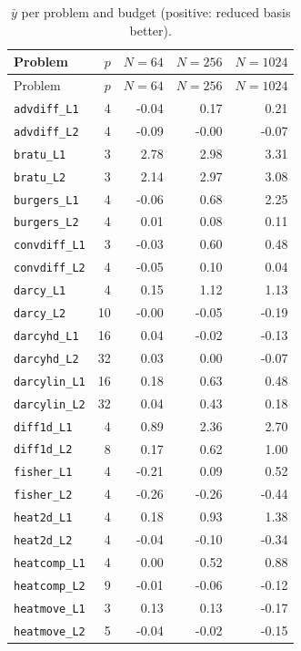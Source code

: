 \begin{longtable}{lrrrr}
\caption{$\bar y$ per problem and budget (positive: reduced basis better).}\label{tab:S-perproblem}\\
\toprule
Problem & $p$ & $N{=}64$ & $N{=}256$ & $N{=}1024$ \\
\endfirsthead
\toprule
Problem & $p$ & $N{=}64$ & $N{=}256$ & $N{=}1024$ \\
\midrule
\endhead
\texttt{advdiff\_L1} & 4 & -0.04 & 0.17 & 0.21 \\
\texttt{advdiff\_L2} & 4 & -0.09 & -0.00 & -0.07 \\
\texttt{bratu\_L1} & 3 & 2.78 & 2.98 & 3.31 \\
\texttt{bratu\_L2} & 3 & 2.14 & 2.97 & 3.08 \\
\texttt{burgers\_L1} & 4 & -0.06 & 0.68 & 2.25 \\
\texttt{burgers\_L2} & 4 & 0.01 & 0.08 & 0.11 \\
\texttt{convdiff\_L1} & 3 & -0.03 & 0.60 & 0.48 \\
\texttt{convdiff\_L2} & 4 & -0.05 & 0.10 & 0.04 \\
\texttt{darcy\_L1} & 4 & 0.15 & 1.12 & 1.13 \\
\texttt{darcy\_L2} & 10 & -0.00 & -0.05 & -0.19 \\
\texttt{darcyhd\_L1} & 16 & 0.04 & -0.02 & -0.13 \\
\texttt{darcyhd\_L2} & 32 & 0.03 & 0.00 & -0.07 \\
\texttt{darcylin\_L1} & 16 & 0.18 & 0.63 & 0.48 \\
\texttt{darcylin\_L2} & 32 & 0.04 & 0.43 & 0.18 \\
\texttt{diff1d\_L1} & 4 & 0.89 & 2.36 & 2.70 \\
\texttt{diff1d\_L2} & 8 & 0.17 & 0.62 & 1.00 \\
\texttt{fisher\_L1} & 4 & -0.21 & 0.09 & 0.52 \\
\texttt{fisher\_L2} & 4 & -0.26 & -0.26 & -0.44 \\
\texttt{heat2d\_L1} & 4 & 0.18 & 0.93 & 1.38 \\
\texttt{heat2d\_L2} & 4 & -0.04 & -0.10 & -0.34 \\
\texttt{heatcomp\_L1} & 4 & 0.00 & 0.52 & 0.88 \\
\texttt{heatcomp\_L2} & 9 & -0.01 & -0.06 & -0.12 \\
\texttt{heatmove\_L1} & 3 & 0.13 & 0.13 & -0.17 \\
\texttt{heatmove\_L2} & 5 & -0.04 & -0.02 & -0.15 \\

\end{longtable}
